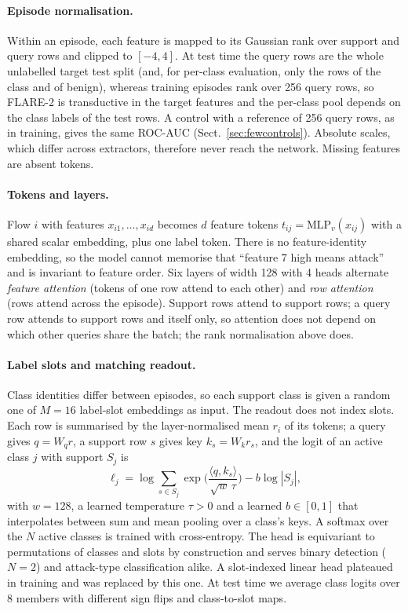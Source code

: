 \documentclass[11pt]{article}
\begin{document}
\paragraph{Episode normalisation.}
Within an episode, each feature is mapped to its Gaussian rank over support and query rows and clipped to $[-4,4]$. At test time the query rows are the whole unlabelled target test split (and, for per-class evaluation, only the rows of the class and of benign), whereas training episodes rank over 256 query rows, so FLARE-2 is transductive in the target features and the per-class pool depends on the class labels of the test rows. A control with a reference of 256 query rows, as in training, gives the same ROC-AUC (Sect.~\ref{sec:fewcontrols}).
Absolute scales, which differ across extractors, therefore never reach the network.
Missing features are absent tokens.

\paragraph{Tokens and layers.}
Flow $i$ with features $x_{i1},\dots,x_{id}$ becomes $d$ feature tokens $t_{ij}=\mathrm{MLP}_v(x_{ij})$ with a shared scalar embedding, plus one label token.
There is no feature-identity embedding, so the model cannot memorise that ``feature 7 high means attack'' and is invariant to feature order.
Six layers of width 128 with 4 heads alternate \emph{feature attention} (tokens of one row attend to each other) and \emph{row attention} (rows attend across the episode).
Support rows attend to support rows; a query row attends to support rows and itself only, so attention does not depend on which other queries share the batch; the rank normalisation above does.

\paragraph{Label slots and matching readout.}
Class identities differ between episodes, so each support class is given a random one of $M=16$ label-slot embeddings as input.
The readout does not index slots.
Each row is summarised by the layer-normalised mean $r_i$ of its tokens; a query gives $q=W_q r$, a support row $s$ gives key $k_s=W_k r_s$, and the logit of an active class $j$ with support $S_j$ is
\begin{equation}
\ell_j=\log\!\!\sum_{s\in S_j}\exp\!\Big(\frac{\langle q,k_s\rangle}{\sqrt{w}\,\tau}\Big)-b\log|S_j|,
\end{equation}
with $w=128$, a learned temperature $\tau>0$ and a learned $b\in[0,1]$ that interpolates between sum and mean pooling over a class's keys.
A softmax over the $N$ active classes is trained with cross-entropy.
The head is equivariant to permutations of classes and slots by construction and serves binary detection ($N=2$) and attack-type classification alike.
A slot-indexed linear head plateaued in training and was replaced by this one.
At test time we average class logits over 8 members with different sign flips and class-to-slot maps.
\end{document}
